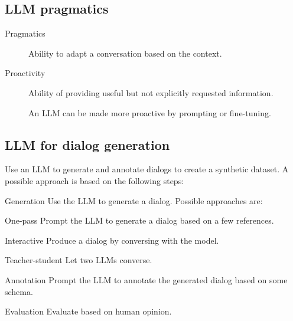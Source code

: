 \subsection{LLM pragmatics}

\begin{description}
    \item[Pragmatics] 
        Ability to adapt a conversation based on the context.

    \item[Proactivity] 
        Ability of providing useful but not explicitly requested information.

        \begin{remark}
            An LLM can be made more proactive by prompting or fine-tuning.
        \end{remark}
\end{description}


\subsection{LLM for dialog generation}

\begin{description}
    \item[Automatic dialog generation] 
        Use an LLM to generate and annotate dialogs to create a synthetic dataset. A possible approach is based on the following steps:
        \begin{descriptionlist}
            \item[Generation] 
                Use the LLM to generate a dialog. Possible approaches are:
                \begin{descriptionlist}
                    \item[One-pass] Prompt the LLM to generate a dialog based on a few references.
                    \item[Interactive] Produce a dialog by conversing with the model.
                    \item[Teacher-student] Let two LLMs converse.
                \end{descriptionlist}

            \item[Annotation] 
                Prompt the LLM to annotate the generated dialog based on some schema.

            \item[Evaluation] 
                Evaluate based on human opinion.
        \end{descriptionlist}
\end{description}